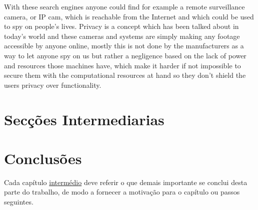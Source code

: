With these search engines anyone could find for example a remote surveillance
camera, or IP cam, which is reachable from the Internet and which could be used
to spy on people's lives. Privacy is a concept which has been talked about in
today's world and these cameras and systems are simply making any footage
accessible by anyone online, mostly this is not done by the manufacturers as a
way to let anyone spy on us but rather a negligence based on the lack of power
and resources those machines have, which make it harder if not impossible to
secure them with the computational resources at hand so they don't shield the
users privacy over functionality.

\section{Secções Intermediarias}
\label{chap2:sec:...}

\section{Conclusões}
\label{chap2:sec:concs}
Cada capítulo \underline{intermédio} deve referir o que demais importante se conclui desta parte do trabalho, de modo a fornecer a motivação para o capítulo ou passos seguintes.
